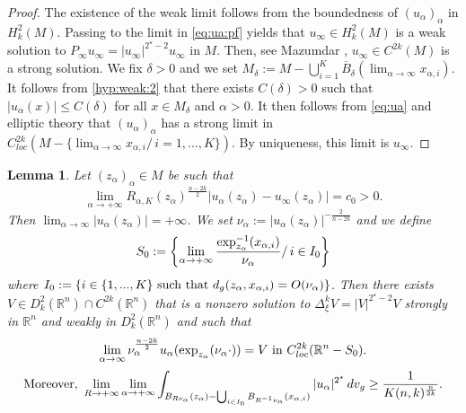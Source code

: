 \documentclass[reqno]{amsart}
\newtheorem{lemma}{Lemma}[section]
\def \rn {\mathbb{R}^n}
\def \crit {2^\star}
\def \ua {u_\alpha}
\def \na {\nu_\alpha}
\def \za {z_\alpha}
\def \xai {x_{\alpha,i}}
\begin{document}
\begin{proof} The existence of the weak limit follows from the boundedness of $(\ua)_\alpha$ in $H_k^2(M)$. Passing to the limit in \eqref{eq:ua:pf} yields that $u_\infty\in H_k^2(M)$ is a weak solution to $P_\infty u_\infty=|u_\infty|^{\crit-2}u_\infty$ in $M$. Then, see Mazumdar \cite{mazumdar:jde}, $u_\infty\in C^{2k}(M)$ is a strong solution. We fix $\delta>0$ and we set $M_\delta:=M -  \bigcup_{i=1}^K\overline{B}_\delta(\lim_{\alpha\to \infty}\xai)$. It follows from \eqref{hyp:weak:2} that there exists $C(\delta)>0$ such that $|u_\alpha(x)|\leq C(\delta)$ for all $x\in M_\delta$ and $\alpha>0$. It then follows from \eqref{eq:ua} and elliptic theory  that $(\ua)_\alpha$ has a strong limit in $C^{2k}_{loc}\left(M-\{\lim_{\alpha\to \infty}\xai/\,i=1,...,K\}\right)$. By uniqueness, this limit is $u_\infty$. \end{proof}
\begin{lemma}\label{lem:3} Let $(\za)_\alpha\in M$ be such that
\begin{equation}\label{eq:67}
\lim_{\alpha\to +\infty}R_{\alpha, K}(\za)^{\frac{n-2k}{2}}|\ua(\za)-u_\infty(\za)|=c_0>0.
\end{equation}
Then $\lim_{\alpha\to \infty}|\ua(\za)|=+\infty$. We set $\na:=|\ua(\za)|^{-\frac{2}{n-2k}}$ and we define
$$S_0:=\left\{\lim_{\alpha\to +\infty}\frac{\hbox{exp}_{\za}^{-1}(\xai)}{\na}/\,i\in I_0\right\}$$
where $I_0:=\{ i\in\{1,...,K\}\hbox{ such that }d_g(\za,\xai)=O(\na)\}$. Then there exists $V\in D_k^2(\rn)\cap C^{2k}(\rn)$ that is a nonzero solution to $\Delta_\xi^kV=|V|^{\crit-2}V$ strongly in $\rn$ and weakly in $D_k^2(\rn)$ and such that
\begin{equation*}
\lim_{\alpha\to\infty}\na^{\frac{n-2k}{2}}\ua(\hbox{exp}_{\za}(\na \cdot))=V\hbox{ in }C^{2k}_{loc}(\rn-S_0).
\end{equation*}
$$\hbox{Moreover, }\lim_{R\to +\infty}\lim_{\alpha\to +\infty}\int_{B_{R\na}(\za)-\bigcup_{i\in I_0}B_{R^{-1}\na}(\xai)}|\ua|^{\crit}\, dv_g\geq \frac{1}{K(n,k)^{\frac{n}{2k}}}.$$
\end{lemma}
\end{document}
